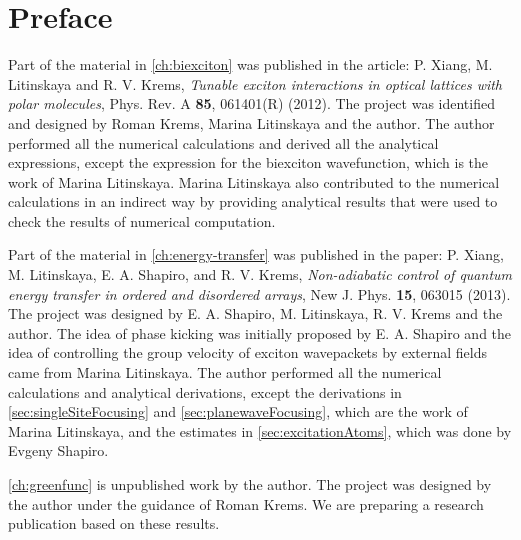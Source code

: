 
\chapter{Preface}

Part of the material in \autoref{ch:biexciton} was published in the article: P. Xiang, M. Litinskaya and R. V. Krems, \textit{ Tunable exciton 
interactions in optical lattices with polar molecules}, Phys. Rev. A {\bf 85}, 061401(R) (2012). The project was identified and 
designed by Roman Krems,  Marina Litinskaya and  the author. The author performed all the numerical calculations and
derived all the analytical expressions, except the expression for the biexciton wavefunction, which is the work of Marina 
Litinskaya. Marina Litinskaya also contributed to the numerical calculations in an indirect way by providing analytical 
results that were used to check the results of numerical computation. 

Part of the material in \autoref{ch:energy-transfer} was published in the paper: P. Xiang, M. Litinskaya, E. A. Shapiro, and R. V. Krems, 
 \textit{ Non-adiabatic control of quantum energy transfer in ordered and disordered arrays}, 
 New J. Phys. {\bf 15}, 063015 (2013).  
The project was designed by E. A. Shapiro, M. Litinskaya, R. V. Krems and the author. The idea of phase kicking was initially
proposed by E. A. Shapiro and the idea of controlling the group velocity of exciton wavepackets by external fields came 
from Marina Litinskaya. The author performed all the numerical calculations and analytical derivations, except the 
derivations in \autoref{sec:singleSiteFocusing} and \autoref{sec:planewaveFocusing}, which are the work of Marina Litinskaya, and the estimates in \autoref{sec:excitationAtoms}, which was done by  Evgeny Shapiro. 

\autoref{ch:greenfunc} is unpublished work by the author. The project was designed by the author under the guidance of
Roman Krems. We are preparing a research publication based on these results. 